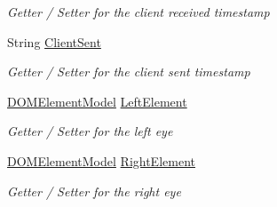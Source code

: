 \begin{DoxyCompactItemize}
\begin{DoxyCompactList}\small\item\em Getter / Setter for the client received timestamp \end{DoxyCompactList}\item 
String \hyperlink{class_web_analyzer_1_1_models_1_1_message_model_1_1_in_data_message_a5b1f5d74b767d71e004ceb28d04927ca}{Client\+Sent}
\begin{DoxyCompactList}\small\item\em Getter / Setter for the client sent timestamp \end{DoxyCompactList}\item 
\hyperlink{class_web_analyzer_1_1_models_1_1_data_model_1_1_d_o_m_element_model}{D\+O\+M\+Element\+Model} \hyperlink{class_web_analyzer_1_1_models_1_1_message_model_1_1_in_data_message_a7669353e9b42a3f58e3b17c00087eb21}{Left\+Element}
\begin{DoxyCompactList}\small\item\em Getter / Setter for the left eye \end{DoxyCompactList}\item 
\hyperlink{class_web_analyzer_1_1_models_1_1_data_model_1_1_d_o_m_element_model}{D\+O\+M\+Element\+Model} \hyperlink{class_web_analyzer_1_1_models_1_1_message_model_1_1_in_data_message_a8b8cd07f6ac3c4a5dd9a5d470b4a113c}{Right\+Element}
\begin{DoxyCompactList}\small\item\em Getter / Setter for the right eye \end{DoxyCompactList}\end{DoxyCompactItemize}
